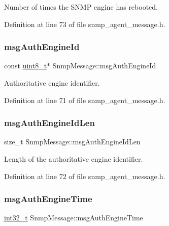 Number of times the S\+N\+MP engine has rebooted. 



Definition at line 73 of file snmp\+\_\+agent\+\_\+message.\+h.

\mbox{\label{structSnmpMessage_a06ca20cfe6a8ffd06e259115fd417efb}} 
\subsubsection{\texorpdfstring{msg\+Auth\+Engine\+Id}{msgAuthEngineId}}
{\footnotesize\ttfamily const \hyperlink{stdint_8h_aba7bc1797add20fe3efdf37ced1182c5}{uint8\+\_\+t}$\ast$ Snmp\+Message\+::msg\+Auth\+Engine\+Id}



Authoritative engine identifier. 



Definition at line 71 of file snmp\+\_\+agent\+\_\+message.\+h.

\mbox{\label{structSnmpMessage_abe5c72a4c4f8a6c07667b0a8b6eae7ac}} 
\subsubsection{\texorpdfstring{msg\+Auth\+Engine\+Id\+Len}{msgAuthEngineIdLen}}
{\footnotesize\ttfamily size\+\_\+t Snmp\+Message\+::msg\+Auth\+Engine\+Id\+Len}



Length of the authoritative engine identifier. 



Definition at line 72 of file snmp\+\_\+agent\+\_\+message.\+h.

\mbox{\label{structSnmpMessage_a3de807da8245c40a6de5365cf841ada7}} 
\subsubsection{\texorpdfstring{msg\+Auth\+Engine\+Time}{msgAuthEngineTime}}
{\footnotesize\ttfamily \hyperlink{stdint_8h_ab1967d8591af1a4e48c37fd2b0f184d0}{int32\+\_\+t} Snmp\+Message\+::msg\+Auth\+Engine\+Time}



